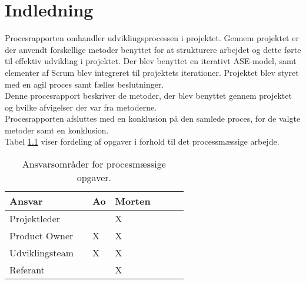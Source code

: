 \chapter{Indledning}
Procesrapporten omhandler udviklingsprocessen i projektet. Gennem projektet er der anvendt
forskellige metoder benyttet for at strukturere arbejdet og dette førte til effektiv
udvikling i projektet.
Der blev benyttet en iterativt ASE-model, samt elementer af Scrum blev integreret til projektets iterationer.
Projektet blev styret med en agil proces samt fælles beslutninger. \\
Denne procesrapport beskriver de metoder, der blev benyttet gennem
projektet og hvilke afvigelser der var fra metoderne. \\ 
Procesrapporten afsluttes med en konklusion på den samlede proces, for de valgte metoder samt en konklusion. \\
Tabel \ref{ProcessTabel} viser fordeling af opgaver i forhold til det processmæssige arbejde.

\begin{table}[H]
	\centering
	\begin{tabular}{lllllll} \hline
		\textbf{Ansvar} &  & \textbf{Ao}&  \textbf{Morten}&   \\ \hline
		Projektleder&  &  &  X&  \\ \hline
		Product Owner&  &  X&  X& \\ \hline
		Udviklingsteam& & X& X& \\  \hline
		Referant& & & X& \\ \hline
	\end{tabular}
	\caption{Ansvarsområder for procesmæssige opgaver.}
	\label{ProcessTabel}
\end{table}